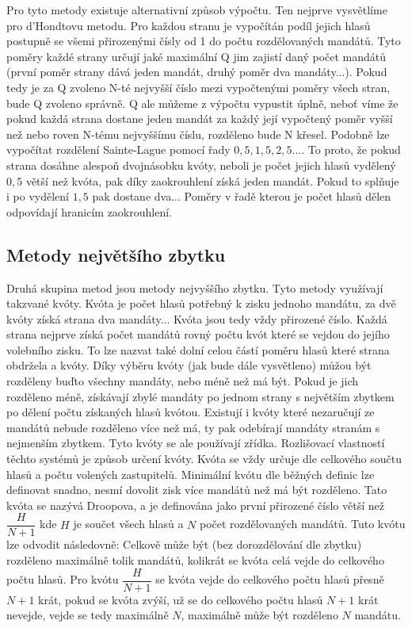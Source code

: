 \documentclass[12pt]{report}
\begin{document}
Pro tyto metody existuje alternativní způsob výpočtu.
Ten nejprve vysvětlíme pro d'Hondtovu metodu.
Pro každou stranu je vypočítán podíl jejich hlasů postupně se všemi přirozenými čísly od 1 do počtu rozdělovaných mandátů.
Tyto poměry každé strany určují jaké maximální Q jim zajistí daný počet mandátů (první poměr strany dává jeden mandát, druhý poměr dva mandáty...).
Pokud tedy je za Q zvoleno N-té nejvyšší číslo mezi vypočtenými poměry všech stran, bude Q zvoleno správně.
Q ale můžeme z výpočtu vypustit úplně, neboť víme že pokud každá strana dostane jeden mandát za každý její vypočtený poměr vyšší než nebo roven N-tému nejvyššímu číslu, rozděleno bude N křesel.
Podobně lze vypočítat rozdělení Sainte-Lague pomocí řady $0{,}5, 1{,}5, 2{,}5...$.
To proto, že pokud strana dosáhne alespoň dvojnásobku kvóty, neboli je počet jejich hlasů vydělený $0{,}5$ větší než kvóta, pak díky zaokrouhlení získá jeden mandát.
Pokud to splňuje i po vydělení $1{,}5$ pak dostane dva...
Poměry v řadě kterou je počet hlasů dělen odpovídají hranicím zaokrouhlení.
\subsection{Metody největšího zbytku} 
Druhá skupina metod jsou metody nejvyššího zbytku.
Tyto metody využívají takzvané kvóty.
Kvóta je počet hlasů potřebný k zisku jednoho mandátu, za dvě kvóty získá strana dva mandáty...
Kvóta jsou tedy vždy přirozené číslo.
Každá strana nejprve získá počet mandátů rovný počtu kvót které se vejdou do jejího volebního zisku.
To lze nazvat také dolní celou částí poměru hlasů které strana obdržela a kvóty.
Díky výběru kvóty (jak bude dále vysvětleno) můžou být rozděleny buďto všechny mandáty, nebo méně než má být.
Pokud je jich rozděleno méně, získávají zbylé mandáty po jednom strany s největším zbytkem po dělení počtu získaných hlasů kvótou.
Existují i kvóty které nezaručují ze mandátů nebude rozděleno více než má, ty pak odebírají mandáty stranám s nejmenším zbytkem.
Tyto kvóty se ale používají zřídka.
Rozlišovací vlastností těchto systémů je způsob určení kvóty.
Kvóta se vždy určuje dle celkového součtu hlasů a počtu volených zastupitelů.
Minimální kvótu dle běžných definic lze definovat snadno, nesmí dovolit zisk více mandátů než má být rozděleno.
Tato kvóta se nazývá Droopova, a je definována jako první přirozené číslo větší než $\dfrac{H}{N+1}$ kde $H$ je součet všech hlasů a $N$ počet rozdělovaných mandátů.
Tuto kvótu lze odvodit následovně: Celkově může být (bez dorozdělování dle zbytku) rozděleno maximálně tolik mandátů, kolikrát se kvóta celá vejde do celkového počtu hlasů.
Pro kvótu $\dfrac{H}{N+1}$ se kvóta vejde do celkového počtu hlasů přesně $N+1$ krát, pokud se kvóta zvýší, už se do celkového počtu hlasů $N+1$ krát nevejde, vejde se tedy maximálně $N$, maximálně může být rozděleno $N$ mandátu.
\end{document}
